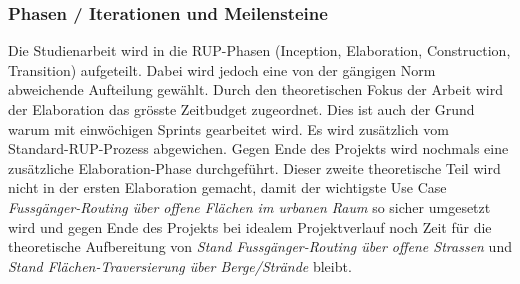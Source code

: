 \subsubsection{Phasen / Iterationen und Meilensteine}
\label{sub:Phasen / Iterationen und Meilensteine}

Die Studienarbeit wird in die \ac{RUP}-Phasen (Inception, Elaboration, Construction, Transition) aufgeteilt. Dabei wird jedoch eine von der gängigen Norm abweichende Aufteilung gewählt. Durch den theoretischen Fokus der Arbeit wird der Elaboration das grösste Zeitbudget zugeordnet. Dies ist auch der Grund warum mit einwöchigen Sprints gearbeitet wird. Es wird zusätzlich vom Standard-\ac{RUP}-Prozess abgewichen. Gegen Ende des Projekts wird nochmals eine zusätzliche Elaboration-Phase durchgeführt. Dieser zweite theoretische Teil wird nicht in der ersten Elaboration gemacht, damit der wichtigste Use Case \textit{Fussgänger-Routing über offene Flächen im urbanen Raum} so sicher umgesetzt wird und gegen Ende des Projekts bei idealem Projektverlauf noch Zeit für die theoretische Aufbereitung von \textit{Stand Fussgänger-Routing über offene Strassen} und \textit{Stand Flächen-Traversierung über Berge/Strände} bleibt.

